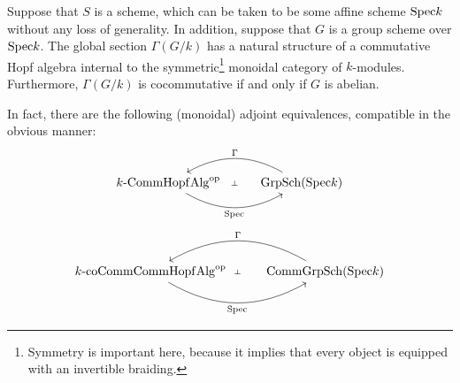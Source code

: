             \begin{example} \label{example: hope_algebra_structures_on_global_sections_of_group_schemes}
                Suppose that $S$ is a scheme, which can be taken to be some affine scheme $\mathrm{Spec} k$ without any loss of generality. In addition, suppose that $G$ is a group scheme over $\mathrm{Spec} k$. The global section $\Gamma(G/k)$ has a natural structure of a commutative Hopf algebra internal to the symmetric\footnote{Symmetry is important here, because it implies that every object is equipped with an invertible braiding.} monoidal category of $k$-modules. Furthermore, $\Gamma(G/k)$ is cocommutative if and only if $G$ is abelian. 
                
                In fact, there are the following (monoidal) adjoint equivalences, compatible in the obvious manner:
                    $$
                        \begin{tikzcd}
                        	{k\-\Comm\Hopf\Alg^{\op}} & {\Grp\Sch(\Spec k)}
                        	\arrow[""{name=0, anchor=center, inner sep=0}, "{\Spec }"', bend right, from=1-1, to=1-2]
                        	\arrow[""{name=1, anchor=center, inner sep=0}, "\Gamma"', bend right, from=1-2, to=1-1]
                        	\arrow["\dashv"{anchor=center, rotate=-90}, draw=none, from=1, to=0]
                        \end{tikzcd}
                    $$
                    $$
                        \begin{tikzcd}
                        	{k\-\co\Comm\Comm\Hopf\Alg^{\op}} & {\Comm\Grp\Sch(\Spec k)}
                        	\arrow[""{name=0, anchor=center, inner sep=0}, "{\Spec }"', bend right, from=1-1, to=1-2]
                        	\arrow[""{name=1, anchor=center, inner sep=0}, "\Gamma"', bend right, from=1-2, to=1-1]
                        	\arrow["\dashv"{anchor=center, rotate=-90}, draw=none, from=1, to=0]
                        \end{tikzcd}
                    $$
            \end{example}
            
